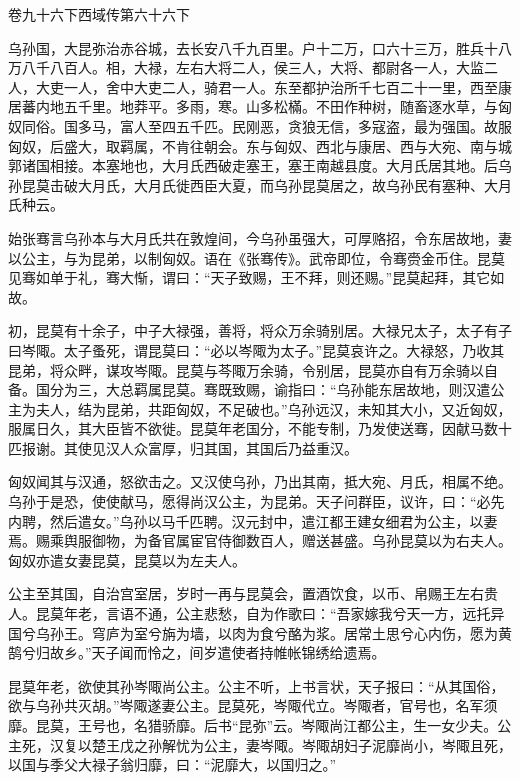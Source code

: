 \documentclass[12pt,UTF8]{ctexbook}
\begin{document}
卷九十六下西域传第六十六下



乌孙国，大昆弥治赤谷城，去长安八千九百里。户十二万，口六十三万，胜兵十八万八千八百人。相，大禄，左右大将二人，侯三人，大将、都尉各一人，大监二人，大吏一人，舍中大吏二人，骑君一人。东至都护治所千七百二十一里，西至康居蕃内地五千里。地莽平。多雨，寒。山多松樠。不田作种树，随畜逐水草，与匈奴同俗。国多马，富人至四五千匹。民刚恶，贪狼无信，多寇盗，最为强国。故服匈奴，后盛大，取羁属，不肯往朝会。东与匈奴、西北与康居、西与大宛、南与城郭诸国相接。本塞地也，大月氏西破走塞王，塞王南越县度。大月氏居其地。后乌孙昆莫击破大月氏，大月氏徙西臣大夏，而乌孙昆莫居之，故乌孙民有塞种、大月氏种云。



始张骞言乌孙本与大月氏共在敦煌间，今乌孙虽强大，可厚赂招，令东居故地，妻以公主，与为昆弟，以制匈奴。语在《张骞传》。武帝即位，令骞赍金币住。昆莫见骞如单于礼，骞大惭，谓曰：“天子致赐，王不拜，则还赐。”昆莫起拜，其它如故。



初，昆莫有十余子，中子大禄强，善将，将众万余骑别居。大禄兄太子，太子有子曰岑陬。太子蚤死，谓昆莫曰：“必以岑陬为太子。”昆莫哀许之。大禄怒，乃收其昆弟，将众畔，谋攻岑陬。昆莫与芩陬万余骑，令别居，昆莫亦自有万余骑以自备。国分为三，大总羁属昆莫。骞既致赐，谕指曰：“乌孙能东居故地，则汉遣公主为夫人，结为昆弟，共距匈奴，不足破也。”乌孙远汉，未知其大小，又近匈奴，服属日久，其大臣皆不欲徙。昆莫年老国分，不能专制，乃发使送骞，因献马数十匹报谢。其使见汉人众富厚，归其国，其国后乃益重汉。



匈奴闻其与汉通，怒欲击之。又汉使乌孙，乃出其南，抵大宛、月氏，相属不绝。乌孙于是恐，使使献马，愿得尚汉公主，为昆弟。天子问群臣，议许，曰：“必先内聘，然后遣女。”乌孙以马千匹聘。汉元封中，遣江都王建女细君为公主，以妻焉。赐乘舆服御物，为备官属宦官侍御数百人，赠送甚盛。乌孙昆莫以为右夫人。匈奴亦遣女妻昆莫，昆莫以为左夫人。



公主至其国，自治宫室居，岁时一再与昆莫会，置酒饮食，以币、帛赐王左右贵人。昆莫年老，言语不通，公主悲愁，自为作歌曰：“吾家嫁我兮天一方，远托异国兮乌孙王。穹庐为室兮旃为墙，以肉为食兮酪为浆。居常土思兮心内伤，愿为黄鹄兮归故乡。”天子闻而怜之，间岁遣使者持帷帐锦绣给遗焉。



昆莫年老，欲使其孙岑陬尚公主。公主不听，上书言状，天子报曰：“从其国俗，欲与乌孙共灭胡。”岑陬遂妻公主。昆莫死，岑陬代立。岑陬者，官号也，名军须靡。昆莫，王号也，名猎骄靡。后书“昆弥”云。岑陬尚江都公主，生一女少夫。公主死，汉复以楚王戊之孙解忧为公主，妻岑陬。岑陬胡妇子泥靡尚小，岑陬且死，以国与季父大禄子翁归靡，曰：“泥靡大，以国归之。”
\end{document}
